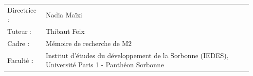 \begin{titlepage}
\begin{center}
\begin{tabular}{lp{10cm}}
    Directrice : & Nadia Maïzi \\
    Tuteur : &  Thibaut Feix\\
    Cadre : & Mémoire de recherche de M2 \\
    Faculté : & Institut d'études du développement de la Sorbonne (IEDES), Université Paris 1 - Panthéon Sorbonne
\end{tabular}

\bigskip
\bigskip

\begin{tabular}{p{15mm}p{10cm}}
\end{tabular}

\end{center}


\end{titlepage}
